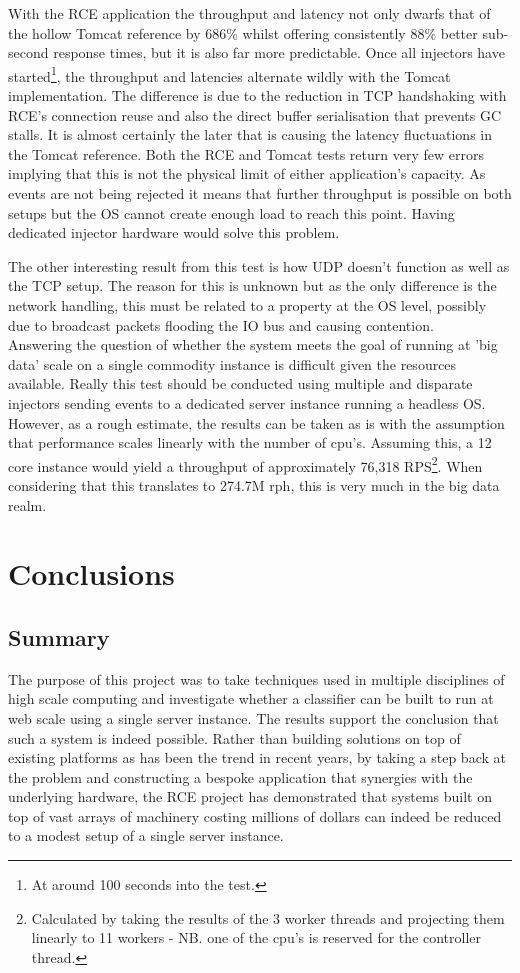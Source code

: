 \documentclass[a4paper,11pt]{scrreprt}
\begin{document}
With the RCE application the throughput and latency not only dwarfs that of the hollow Tomcat reference by 686\% whilst offering consistently 88\% better sub-second response times, but it is also far more predictable. Once all injectors have started\footnote{At around 100 seconds into the test.}, the throughput and latencies alternate wildly with the Tomcat implementation. The difference is due to the reduction in TCP handshaking with RCE's connection reuse and also the direct buffer serialisation that prevents GC stalls. It is almost certainly the later that is causing the latency fluctuations in the Tomcat reference. Both the RCE and Tomcat tests return very few errors implying that this is not the physical limit of either application's capacity. As events are not being rejected it means that further throughput is possible on both setups but the OS cannot create enough load to reach this point. Having dedicated injector hardware would solve this problem. \

The other interesting result from this test is how UDP doesn't function as well as the TCP setup. The reason for this is unknown but as the only difference is the network handling, this must be related to a property at the OS level, possibly due to broadcast packets flooding the IO bus and causing contention. \\

Answering the question of whether the system meets the goal of running at 'big data' scale on a single commodity instance is difficult given the resources available. Really this test should be conducted using multiple and disparate injectors sending events to a dedicated server instance running a headless OS. However, as a rough estimate, the results can be taken as is with the assumption that performance scales linearly with the number of \acrshort{cpu}'s. Assuming this, a 12 core instance would yield a throughput of approximately 76,318 RPS\footnote{Calculated by taking the results of the 3 worker threads and projecting them linearly to 11 workers - NB. one of the \acrshort{cpu}'s is reserved for the controller thread.}. When considering that this translates to 274.7M \acrshort{rph}, this is very much in the big data realm.

\chapter{Conclusions}
\section{Summary}
The purpose of this project was to take techniques used in multiple disciplines of high scale computing and investigate whether a classifier can be built to run at web scale using a single server instance. The results support the conclusion that such a system is indeed possible. Rather than building solutions on top of existing platforms as has been the trend in recent years, by taking a step back at the problem and constructing a bespoke application that synergies with the underlying hardware, the RCE project has demonstrated that systems built on top of vast arrays of machinery costing millions of dollars can indeed be reduced to a modest setup of a single server instance. 
\end{document}
